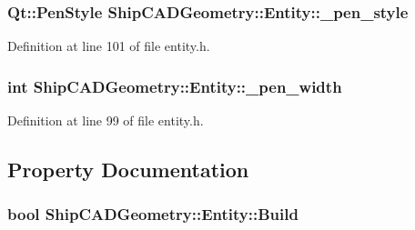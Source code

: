\hypertarget{classShipCADGeometry_1_1Entity_ab251bdeaec08bb1474ba57725735198a}{
\subsubsection[{\-\_\-pen\-\_\-style}]{\setlength{\rightskip}{0pt plus 5cm}Qt\-::\-Pen\-Style Ship\-C\-A\-D\-Geometry\-::\-Entity\-::\-\_\-pen\-\_\-style\hspace{0.3cm}{\ttfamily [protected]}}}\label{classShipCADGeometry_1_1Entity_ab251bdeaec08bb1474ba57725735198a}


Definition at line 101 of file entity.\-h.

\hypertarget{classShipCADGeometry_1_1Entity_af9d015ffcbdc506db94c677be5b2f8ec}{
\subsubsection[{\-\_\-pen\-\_\-width}]{\setlength{\rightskip}{0pt plus 5cm}int Ship\-C\-A\-D\-Geometry\-::\-Entity\-::\-\_\-pen\-\_\-width\hspace{0.3cm}{\ttfamily [protected]}}}\label{classShipCADGeometry_1_1Entity_af9d015ffcbdc506db94c677be5b2f8ec}


Definition at line 99 of file entity.\-h.



\subsection{Property Documentation}
\hypertarget{classShipCADGeometry_1_1Entity_a9dc2f1b0245a88b3ed9b9b47f626fdb3}{
\subsubsection[{Build}]{\setlength{\rightskip}{0pt plus 5cm}bool Ship\-C\-A\-D\-Geometry\-::\-Entity\-::\-Build\hspace{0.3cm}{\ttfamily [read]}}}\label{classShipCADGeometry_1_1Entity_a9dc2f1b0245a88b3ed9b9b47f626fdb3}


